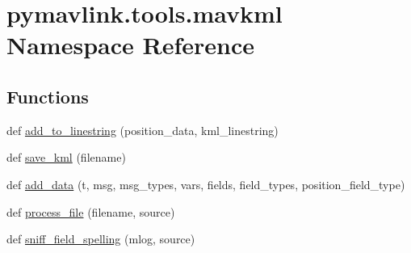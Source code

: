 \hypertarget{namespacepymavlink_1_1tools_1_1mavkml}{}\section{pymavlink.\+tools.\+mavkml Namespace Reference}
\label{namespacepymavlink_1_1tools_1_1mavkml}
\subsection*{Functions}
\begin{DoxyCompactItemize}
\item 
def \hyperlink{namespacepymavlink_1_1tools_1_1mavkml_abf0b47cf026ca292449dfdc677ca6fd0}{add\+\_\+to\+\_\+linestring} (position\+\_\+data, kml\+\_\+linestring)
\item 
def \hyperlink{namespacepymavlink_1_1tools_1_1mavkml_a7ec121b5d220429cb465ea4f5a867b05}{save\+\_\+kml} (filename)
\item 
def \hyperlink{namespacepymavlink_1_1tools_1_1mavkml_a356af6d8a50929dbc97b578a26b02c89}{add\+\_\+data} (t, msg, msg\+\_\+types, vars, fields, field\+\_\+types, position\+\_\+field\+\_\+type)
\item 
def \hyperlink{namespacepymavlink_1_1tools_1_1mavkml_ad58bf3cda161593500630a9c8f812612}{process\+\_\+file} (filename, source)
\item 
def \hyperlink{namespacepymavlink_1_1tools_1_1mavkml_a8ad19bfa7dde8905f7ad26695e780678}{sniff\+\_\+field\+\_\+spelling} (mlog, source)
\end{DoxyCompactItemize}
